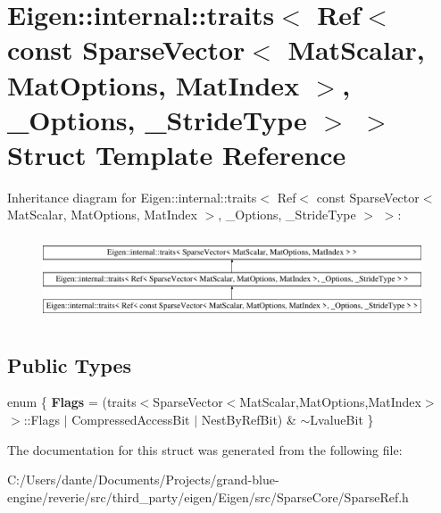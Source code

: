 \hypertarget{struct_eigen_1_1internal_1_1traits_3_01_ref_3_01const_01_sparse_vector_3_01_mat_scalar_00_01_mat15c4780d000a619e80140ca70456913a}{}\section{Eigen\+::internal\+::traits$<$ Ref$<$ const Sparse\+Vector$<$ Mat\+Scalar, Mat\+Options, Mat\+Index $>$, \+\_\+\+Options, \+\_\+\+Stride\+Type $>$ $>$ Struct Template Reference}
\label{struct_eigen_1_1internal_1_1traits_3_01_ref_3_01const_01_sparse_vector_3_01_mat_scalar_00_01_mat15c4780d000a619e80140ca70456913a}
Inheritance diagram for Eigen\+::internal\+::traits$<$ Ref$<$ const Sparse\+Vector$<$ Mat\+Scalar, Mat\+Options, Mat\+Index $>$, \+\_\+\+Options, \+\_\+\+Stride\+Type $>$ $>$\+:\begin{figure}[H]
\begin{center}
\leavevmode
\includegraphics[height=2.530120cm]{struct_eigen_1_1internal_1_1traits_3_01_ref_3_01const_01_sparse_vector_3_01_mat_scalar_00_01_mat15c4780d000a619e80140ca70456913a}
\end{center}
\end{figure}
\subsection*{Public Types}
\begin{DoxyCompactItemize}
\item 
\mbox{\label{struct_eigen_1_1internal_1_1traits_3_01_ref_3_01const_01_sparse_vector_3_01_mat_scalar_00_01_mat15c4780d000a619e80140ca70456913a_ac1018b6b47101ed28460858939faec61}} 
enum \{ {\bfseries Flags} = (traits$<$Sparse\+Vector$<$Mat\+Scalar,Mat\+Options,Mat\+Index$>$ $>$\+::Flags $\vert$ Compressed\+Access\+Bit $\vert$ Nest\+By\+Ref\+Bit) \& $\sim$\+Lvalue\+Bit
 \}
\end{DoxyCompactItemize}


The documentation for this struct was generated from the following file\+:\begin{DoxyCompactItemize}
\item 
C\+:/\+Users/dante/\+Documents/\+Projects/grand-\/blue-\/engine/reverie/src/third\+\_\+party/eigen/\+Eigen/src/\+Sparse\+Core/Sparse\+Ref.\+h\end{DoxyCompactItemize}
